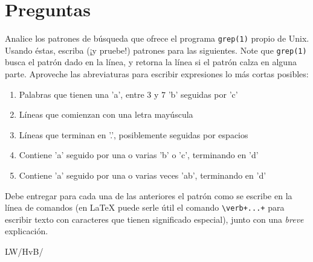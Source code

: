 \documentclass[spanish, fleqn]{article}
\title{Informática Teórica\\
       Tarea \#\num \\
       ``¡Precalentamiento!''}
\author{Language Warriors}
\date{4 de septiembre de 2017}
\begin{document}
\maketitle
\thispagestyle{empty}

\section*{Preguntas}

  Analice los patrones de búsqueda que ofrece el programa \texttt{grep(1)}
  propio de Unix.
  Usando éstas,
  escriba
  (¡y pruebe!)
  patrones para las siguientes.
  Note que \texttt{grep(1)} busca el patrón dado en la línea,
  y retorna la línea si el patrón calza en alguna parte.
  Aproveche las abreviaturas para escribir expresiones
  lo más cortas posibles:
  \begin{enumerate}
  \item
    Palabras que tienen una 'a', entre \(3\) y \(7\) 'b' seguidas por 'c'
  \item
    Líneas que comienzan con una letra mayúscula
  \item
    Líneas que terminan en '.',
    posiblemente seguidas por espacios
  \item
    Contiene 'a' seguido por una o varias 'b' o 'c',
    terminando en 'd'
  \item
    Contiene 'a' seguido por una o varias veces 'ab', terminando en 'd'
  \end{enumerate}
  Debe entregar para cada una de las anteriores el patrón
  como se escribe en la línea de comandos
  (en \LaTeX{} puede serle útil el comando \verb!\verb+...+!
   para escribir texto con caracteres que tienen significado especial),
  junto con una \emph{breve} explicación.


  \vfill\hfill LW/HvB/\LaTeXe
\end{document}
